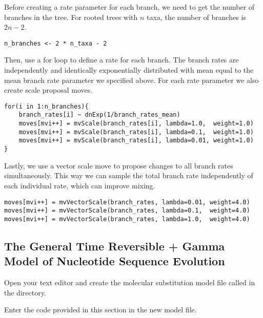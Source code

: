 Before creating a rate parameter for each branch, we need to get the number of branches in the tree. For rooted trees with $n$ taxa, the number of branches is $2n-2$.

{\tt \begin{snugshade*}
\begin{lstlisting}
n_branches <- 2 * n_taxa - 2
\end{lstlisting}
\end{snugshade*}}

Then, use a for loop to define a rate for each branch.
The branch rates are independently and identically exponentially distributed with mean equal to the mean branch rate parameter we specified above.
For each rate parameter we also create scale proposal moves.
{\tt \begin{snugshade*}
\begin{lstlisting}
for(i in 1:n_branches){
    branch_rates[i] ~ dnExp(1/branch_rates_mean)
    moves[mvi++] = mvScale(branch_rates[i], lambda=1.0,  weight=1.0)
    moves[mvi++] = mvScale(branch_rates[i], lambda=0.1,  weight=1.0)
    moves[mvi++] = mvScale(branch_rates[i], lambda=0.01, weight=1.0)
}
\end{lstlisting}
\end{snugshade*}}

Lastly, we use a vector scale move to propose changes to all branch rates simultaneously.
This way we can sample the total branch rate independently of each individual rate, which can improve mixing.
{\tt \begin{snugshade*}
\begin{lstlisting}
moves[mvi++] = mvVectorScale(branch_rates, lambda=0.01, weight=4.0) 
moves[mvi++] = mvVectorScale(branch_rates, lambda=0.1,  weight=4.0) 
moves[mvi++] = mvVectorScale(branch_rates, lambda=1.0,  weight=4.0)
\end{lstlisting}
\end{snugshade*}}

\bigskip

\subsection{The General Time Reversible + Gamma Model of Nucleotide Sequence Evolution}\label{subsect:RB-ModelGTRG}

{\begin{framed}
Open your text editor and create the molecular substitution model file called {\textcolor{red}{}} in the  directory.

Enter the \Rev code provided in this section in the new model file.
\end{framed}}

